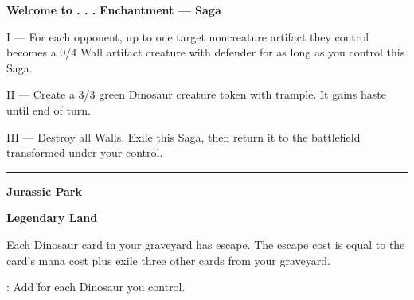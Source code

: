 \documentclass[8pt]{extarticle}
\begin{document}
{\large\textbf{Welcome to . . .}}
\hfill
\1\G\G

\textbf{Enchantment — Saga}

I — For each opponent, up to one target noncreature artifact they control becomes a 0/4 Wall artifact creature with defender for as long as you control this Saga.

II — Create a 3/3 green Dinosaur creature token with trample. It gains haste until end of turn.

III — Destroy all Walls. Exile this Saga, then return it to the battlefield transformed under your control.

\vfill
\hrule
\vfill

{\large\textbf{Jurassic Park}}

\textbf{Legendary Land}

Each Dinosaur card in your graveyard has escape. The escape cost is equal to the card's mana cost plus exile three other cards from your graveyard. 

\T: Add \G for each Dinosaur you control.
\end{document}
